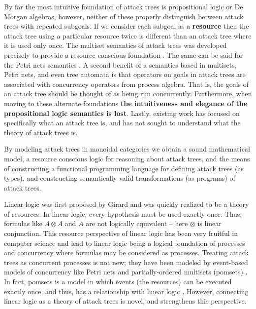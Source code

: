 \documentclass{sigplanconf}
\begin{document}
By far the most intuitive foundation of attack trees is propositional
logic or De Morgan algebras, however, neither of these properly
distinguish between attack trees with repeated subgoals.  If we
consider each subgoal as a \textbf{resource} then the attack tree
using a particular resource twice is different than an attack tree
where it is used only once.  The multiset semantics of attack trees
was developed precisely to provide a resource conscious foundation
\cite{Mauw:2006}. The same can be said for the Petri nets semantics
\cite{McDermott:2001}.  A second benefit of a semantics based in
multisets, Petri nets, and even tree automata is that operators on
goals in attack trees are associated with concurrency operators from
process algebra.  That is, the goals of an attack tree should be
thought of as being run concurrently.  Furthermore, when moving to
these alternate foundations \textbf{the intuitiveness and elegance of
  the propositional logic semantics is lost}.  Lastly, existing work
has focused on specifically what an attack tree is, and has not sought
to understand what the theory of attack trees is.

By modeling attack trees in monoidal categories we obtain a sound
mathematical model, a resource conscious logic for reasoning about
attack trees, and the means of constructing a functional programming
language for defining attack trees (as types), and constructing
semantically valid transformations (as programs) of attack trees.

Linear logic was first proposed by Girard \cite{Girard:1987} and was
quickly realized to be a theory of resources.  In linear logic, every
hypothesis must be used exactly once.  Thus, formulas like $A \otimes
A$ and $A$ are not logically equivalent -- here $\otimes$ is linear
conjunction.  This resource perspective of linear logic has been very
fruitful in computer science and lead to linear logic being a logical
foundation of processes and concurrency where formulas may be
considered as processes.  Treating attack trees as concurrent
processes is not new; they have been modeled by event-based models of
concurrency like Petri nets and partially-ordered multisets (pomsets)
\cite{Jhawar:2015,Mauw:2006}.  In fact, pomsets is a model in which
events (the resources) can be executed exactly once, and thus, has a
relationship with linear logic \cite{Retore:1997}.  However,
connecting linear logic as a theory of attack trees is novel, and
strengthens this perspective.
\end{document}
